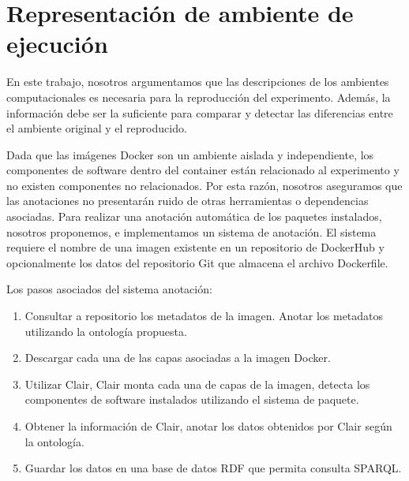 
\chapter{Representación de ambiente de ejecución} %


En este trabajo, nosotros argumentamos que las descripciones de los ambientes computacionales es necesaria para la reproducción  del experimento. Además, la información debe ser la suficiente para comparar y detectar las diferencias entre el ambiente original y el reproducido.

Dada que las imágenes Docker son un ambiente aislada y independiente, los componentes de software dentro del container están relacionado al experimento y no existen componentes no relacionados. 
Por esta razón, nosotros aseguramos que las anotaciones no presentarán ruido de otras herramientas o dependencias asociadas.
Para realizar una anotación automática de los paquetes instalados, nosotros proponemos, e implementamos un sistema de anotación.
El sistema requiere el nombre de una imagen existente en un repositorio de DockerHub y opcionalmente los datos del repositorio Git que almacena el archivo Dockerfile. 

Los pasos asociados del sistema anotación:

\begin{enumerate}
	\item Consultar a repositorio los metadatos de la imagen. Anotar los metadatos utilizando la ontología propuesta.
	\item Descargar cada una de las capas asociadas a la imagen Docker.
	\item Utilizar Clair, Clair monta cada una de capas de la imagen, detecta los componentes de software instalados utilizando el sistema de paquete.
	\item Obtener la información de Clair, anotar los datos obtenidos por Clair según la ontología.
	\item Guardar los datos en una base de datos RDF que permita consulta SPARQL.
\end{enumerate} 


